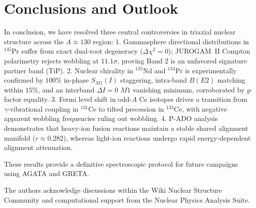 \documentclass[aps,prc,twocolumn,showpacs,superscriptaddress,floatfix,nofootinbib]{revtex4-2}
\begin{document}
\section{Conclusions and Outlook}
\label{sec:concl}

In conclusion, we have resolved three central controversies in triaxial nuclear structure across the $A \approx 130$ region:
1. Gammasphere directional distributions in $^{135}\text{Pr}$ suffer from exact dual-root degeneracy ($\Delta\chi^2=0$); JUROGAM~II Compton polarimetry rejects wobbling at $11.1\sigma$, proving Band 2 is an unfavored signature partner band (TiP).
2. Nuclear chirality in $^{135}\text{Nd}$ and $^{134}\text{Pr}$ is experimentally confirmed by $100\%$ in-phase $S_{M1}(I)$ staggering, intra-band $B(E2)$ matching within $15\%$, and an interband $\Delta I=0$ $M1$ vanishing minimum, corroborated by $g$-factor equality.
3. Fermi level shift in odd-$A$ Ce isotopes drives a transition from $\gamma$-vibrational coupling in $^{131}\text{Ce}$ to tilted precession in $^{133}\text{Ce}$, with negative apparent wobbling frequencies ruling out wobbling.
4. P-ADO analysis demonstrates that heavy-ion fusion reactions maintain a stable shared alignment manifold ($r \approx 0.282$), whereas light-ion reactions undergo rapid energy-dependent alignment attenuation.

These results provide a definitive spectroscopic protocol for future campaigns using AGATA and GRETA.

\begin{acknowledgments}
The authors acknowledge discussions within the Wiki Nuclear Structure Community and computational support from the Nuclear Physics Analysis Suite.
\end{acknowledgments}


\end{document}
